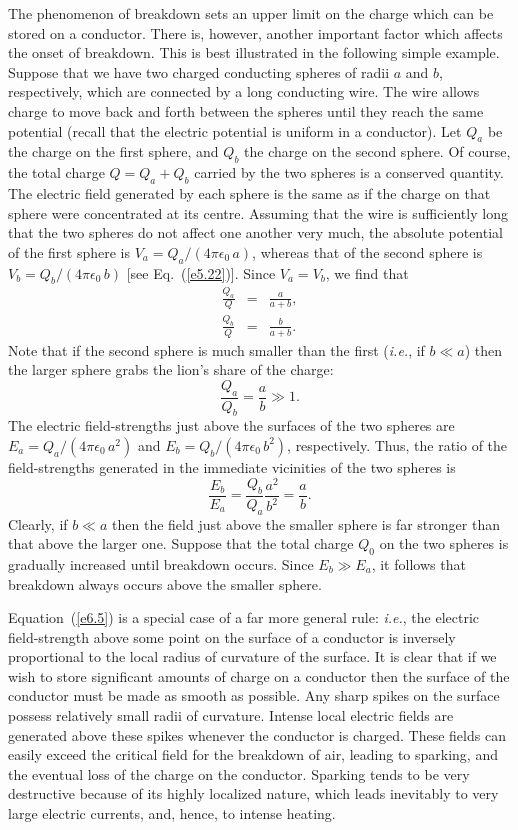 The phenomenon of breakdown sets an upper limit on the charge which
can be stored on a conductor. There is, however, another important factor which 
affects the onset of breakdown. This is best illustrated in the following
simple example. Suppose that we have two charged conducting spheres of radii $a$ and
$b$, respectively,  which are connected by a long conducting wire. The wire allows charge to
move back and forth between the spheres until they reach the same potential (recall
that the electric potential is uniform in a conductor). Let $Q_a$ be the
charge on the  first sphere, and $Q_b$ the charge on the second sphere. Of course,
the total charge $Q = Q_a  + Q_b$ carried by the two spheres is a conserved quantity.
The electric field generated by each sphere is the same as if the charge on that
sphere were concentrated at its centre. Assuming that the wire is sufficiently
long that the  two spheres do not
affect one another very much, the absolute potential of the first sphere
is $V_a = Q_a/(4\pi\epsilon_0\,a)$, whereas that of the second
sphere is $V_b = Q_b/(4\pi\epsilon_0\,b)$ [see Eq.~(\ref{e5.22})]. Since $V_a = V_b$, we find that
\begin{eqnarray}
\frac{Q_a}{Q} &=& \frac{a}{a+b},\\[0.5ex]
\frac{Q_b}{Q} &=& \frac{b}{a+b}.
\end{eqnarray}
Note that if the second sphere is much smaller than the first
({\em i.e.}, if $b\ll a$) then the larger sphere grabs the lion's
share of the charge:
\begin{equation}
\frac{Q_a}{Q_b} = \frac{a}{b} \gg 1.
\end{equation}
The electric field-strengths just above the surfaces of the two spheres are
$E_a = Q_a/(4\pi\epsilon_0\,a^2)$ and $E_b= Q_b/(4\pi\epsilon_0\,b^2)$,
respectively. Thus, the ratio of the field-strengths generated in the immediate
vicinities of the two spheres is 
\begin{equation}\label{e6.5}
\frac{E_b}{E_a} = \frac{Q_b}{Q_a}\frac{a^2}{b^2}=\frac{a}{b}.
\end{equation}
Clearly, if $b\ll a$ then the field just above the smaller sphere is
far stronger than that above the larger one. Suppose that  the total
charge $Q_0$ on the two spheres is gradually increased until breakdown
occurs. Since $E_b\gg E_a$, it follows that breakdown always occurs above the
smaller sphere. 

Equation~(\ref{e6.5}) is a special case of a far more general rule: 
{\em i.e.}, the electric
field-strength above some point on the surface of a conductor is inversely proportional
to the local radius of curvature of the surface. It is clear that
if we wish to store significant amounts of charge on a conductor
then the surface of the conductor must be made as smooth as
possible. Any sharp spikes on the surface  possess
relatively small radii of curvature. Intense local electric 
fields are generated above these spikes whenever the conductor is charged.
These fields can easily exceed the critical field for the breakdown
of air, leading to sparking, and the eventual loss of the charge on
the conductor. Sparking tends to be very destructive because of
its highly localized nature, which leads inevitably  to very large  electric currents,
and, hence, to  intense heating.

